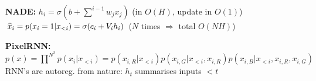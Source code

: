 \textbf{NADE:} $h_i = \sigma(b + \sum^{i-1} w_j x_j)$ (in $O(H)$, update in $O(1)$)\\
$\widehat{x}_i = p(x_i=1| x_{<i}) = \sigma(c_i + V_i h_i)$ ($N$ times $\Rightarrow$ total $O(NH)$)\\

\textbf{PixelRNN:} $p(x) = \prod^{N^2} p(x_i | x_{<i}) = p(x_{i,R} | x_{<i}) p(x_{i,G} | x_{<i}, x_{i,R}) p(x_{i,B} | x_{<i}, x_{i,R}, x_{i,G})$\\
RNN's are autoreg. from nature: $h_t$ summarises inputs $<t$\\

